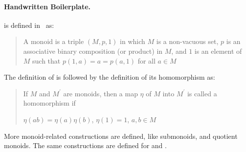 \paragraph{Handwritten Boilerplate.}
 is defined in~\cite{jacobson1985basic} as: 
\begin{quote}
    A monoid is a triple $(M,p,1)$ in which $M$ is a non-vacuous set, $p$ is an associative binary composition (or product) in $M$, and $1$ is an element of $M$ such that $p(1,a)= a = p(a,1)$ for all $a \in M$ 
\end{quote}
The definition of  is followed by the definition of its homomorphism as: 
\begin{quote}
If $M$ and $M^\prime$ are monoids, then a map $\eta$ of $M$ into $M^\prime$ is called a homomorphism if 
\begin{multicols}{3}
    $\eta(ab)=\eta(a)\eta(b)$, \vfill   
    \columnbreak
    $\eta(1) = 1$, \vfill   
    \columnbreak 
    $a,b \in M$  \vfill    
\end{multicols}
\end{quote}
More monoid-related constructions are defined, like submonoids, and quotient monoids. The same constructions are defined for  and . 

